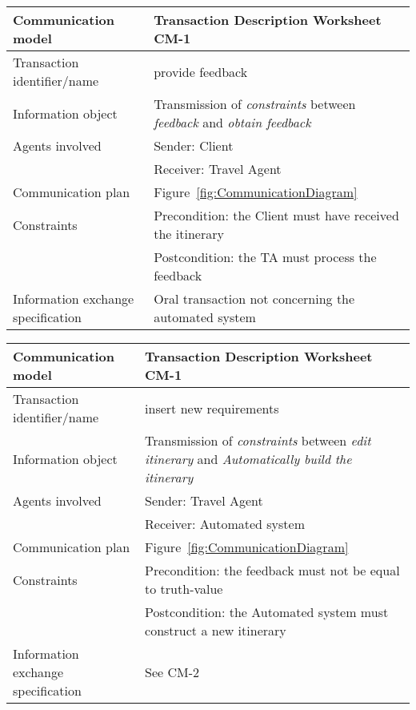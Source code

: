 \newline
\vspace{0.8 cm}
\newline
\noindent
\begin{tabular}%
      {|p{3cm}%
        |p{9cm}|}
\hline
{\bf Communication model} &
   {\bf Transaction Description Worksheet CM-1} \\
\hline
\hline
\sc Transaction identifier/name &
   {\rm provide feedback } \\
\hline
\sc Information object &
   {\rm
   Transmission of \textit{constraints} between \textit{feedback} and \textit{obtain feedback}
   } \\
\hline
\sc Agents involved &
   {\rm Sender: Client} \\
   & {\rm Receiver: Travel Agent}\\
\hline
\sc Communication plan &
   {\rm
   Figure~\ref{fig:CommunicationDiagram}
   } \\
\hline
\sc Constraints &
   {\rm Precondition: the Client must have received the itinerary}\\
   & {\rm Postcondition: the TA must process the feedback } \\
\hline
\sc Information exchange specification &
   {\rm
   Oral transaction not concerning the automated system
   } \\
\hline
\end{tabular}
\newline
\vspace{0.8 cm}
\newline
\noindent
\begin{tabular}%
      {|p{3cm}%
        |p{9cm}|}
\hline
{\bf Communication model} &
   {\bf Transaction Description Worksheet CM-1} \\
\hline
\hline
\sc Transaction identifier/name &
   {\rm insert new requirements } \\
\hline
\sc Information object &
   {\rm
   Transmission of \textit{constraints} between \textit{edit itinerary} and \textit{Automatically build the itinerary}
   } \\
\hline
\sc Agents involved &
   {\rm Sender: Travel Agent} \\
   & {\rm Receiver: Automated system}\\
\hline
\sc Communication plan &
   {\rm
   Figure~\ref{fig:CommunicationDiagram}
   } \\
\hline
\sc Constraints &
   {\rm Precondition: the feedback must not be equal to truth-value}\\
   & {\rm Postcondition: the Automated system must construct a new itinerary } \\
\hline
\sc Information exchange specification &
   {\rm
   See CM-2 
   } \\
\hline
\end{tabular}







